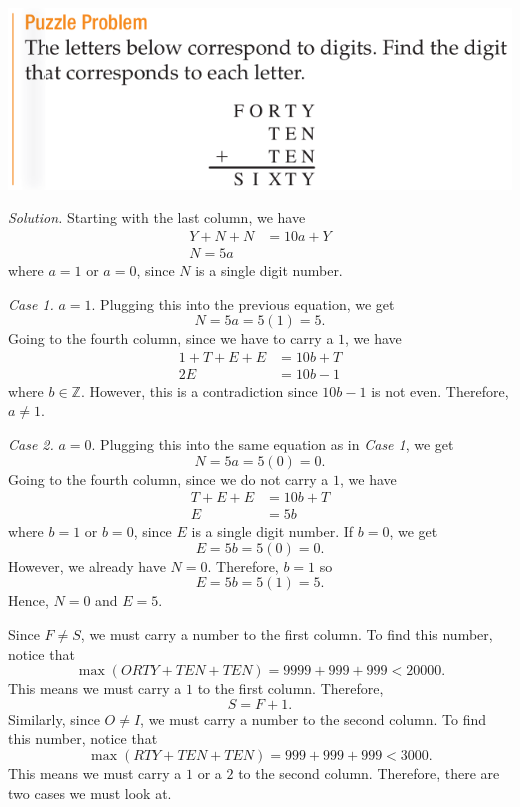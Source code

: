 \documentclass[12pt]{article}
\begin{document}
\begin{center}
\includegraphics[scale=0.6]{forty.png}
\end{center}

\noindent\textit{Solution.}
Starting with the last column, we have
\begin{align*}
    Y+N+N&=10a+Y\\
    N=5a
\end{align*}
where $a=1$ or $a=0$, since $N$ is a single digit number.
\vspace{20px}

\noindent\textit{Case 1.} $a=1$. Plugging this into the previous equation, we get
\[N=5a=5(1)=5.\]
Going to the fourth column, since we have to carry a $1$, we have
\begin{align*}
    1+T+E+E&=10b+T\\
    2E&=10b-1
\end{align*}
where $b\in\mathbb{Z}$. However, this is a contradiction since $10b-1$ is not even. Therefore, $a\neq 1$.
\vspace{20px}

\noindent\textit{Case 2.} $a=0$. Plugging this into the same equation as in \textit{Case 1}, we get
\[N=5a=5(0)=0.\]
Going to the fourth column, since we do not carry a $1$, we have
\begin{align*}
    T+E+E&=10b+T\\
    E&=5b
\end{align*}
where $b=1$ or $b=0$, since $E$ is a single digit number. If $b=0$, we get
\[E=5b=5(0)=0.\]
However, we already have $N=0$. Therefore, $b=1$ so
\[E=5b=5(1)=5.\]
Hence, $\boxed{N=0}$ and $\boxed{E=5}$.
\newpage

\noindent Since $F\neq S$, we must carry a number to the first column. To find this number, notice that
\[\max(ORTY+TEN+TEN)=9999+999+999<20000.\]
This means we must carry a $1$ to the first column. Therefore,
\[S=F+1.\]
Similarly, since $O\neq I$, we must carry a number to the second column. To find this number, notice that
\[\max(RTY+TEN+TEN)=999+999+999<3000.\]
This means we must carry a $1$ or a $2$ to the second column. Therefore, there are two cases we must look at.
\vspace{20px}
\end{document}
